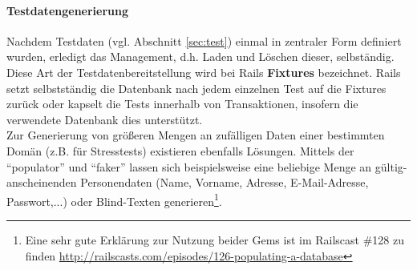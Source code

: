 \paragraph{Testdatengenerierung}
Nachdem Testdaten (vgl. Abschnitt \ref{sec:test}) einmal in zentraler Form definiert wurden, erledigt  das Management, d.h. Laden und Löschen dieser, selbständig. Diese Art der Testdatenbereitstellung wird bei Rails \textbf{Fixtures} bezeichnet. Rails setzt selbstständig die Datenbank nach jedem einzelnen Test auf die Fixtures zurück oder kapselt die Tests innerhalb von Transaktionen, insofern die verwendete Datenbank dies unterstützt.\\

Zur Generierung von größeren Mengen an zufälligen Daten einer bestimmten Domän (z.B. für Stresstests) existieren ebenfalls Lösungen. Mittels der  "`populator"' und "`faker"' lassen sich beispielsweise eine beliebige Menge an gültig-anscheinenden Personendaten (Name, Vorname, Adresse, E-Mail-Adresse, Passwort,...) oder Blind-Texten generieren\footnote{Eine sehr gute Erklärung zur Nutzung beider Gems ist im Railscast \#128 zu finden \url{http://railscasts.com/episodes/126-populating-a-database}}.


